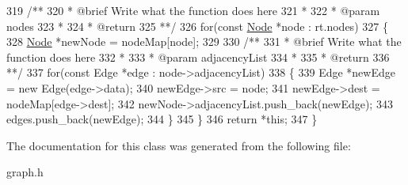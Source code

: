 \begin{DoxyCode}
319 \textcolor{comment}{            /**}
320 \textcolor{comment}{             * @brief Write what the function does here}
321 \textcolor{comment}{             *}
322 \textcolor{comment}{             * @param nodes}
323 \textcolor{comment}{             *}
324 \textcolor{comment}{             * @return}
325 \textcolor{comment}{             **/}
326             \textcolor{keywordflow}{for}(\textcolor{keyword}{const} \hyperlink{structNode}{Node} *node : rt.nodes)
327             \{
328                 \hyperlink{structNode}{Node} *newNode = nodeMap[node];
329 \textcolor{comment}{}
330 \textcolor{comment}{                /**}
331 \textcolor{comment}{                 * @brief Write what the function does here}
332 \textcolor{comment}{                 *}
333 \textcolor{comment}{                 * @param adjacencyList}
334 \textcolor{comment}{                 *}
335 \textcolor{comment}{                 * @return}
336 \textcolor{comment}{                 **/}
337                 \textcolor{keywordflow}{for}(\textcolor{keyword}{const} Edge *edge : node->adjacencyList)
338                 \{
339                     Edge *newEdge = \textcolor{keyword}{new} Edge(edge->data);
340                     newEdge->src = node;
341                     newEdge->dest = nodeMap[edge->dest];
342                     newNode->adjacencyList.push\_back(newEdge);
343                     edges.push\_back(newEdge);
344                 \}
345             \}
346             \textcolor{keywordflow}{return} *\textcolor{keyword}{this};
347         \}
\end{DoxyCode}


The documentation for this class was generated from the following file\+:\begin{DoxyCompactItemize}
\item 
graph.\+h\end{DoxyCompactItemize}
